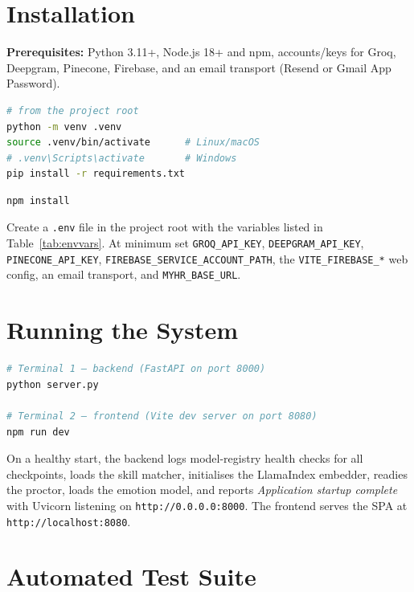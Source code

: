 \documentclass[12pt,a4paper,oneside]{report}
\begin{document}
\section{Installation}

\textbf{Prerequisites:} Python 3.11+, Node.js 18+ and npm, accounts/keys for Groq, Deepgram,
Pinecone, Firebase, and an email transport (Resend or Gmail App Password).

\begin{lstlisting}[language=bash, caption={Backend installation}]
# from the project root
python -m venv .venv
source .venv/bin/activate      # Linux/macOS
# .venv\Scripts\activate       # Windows
pip install -r requirements.txt
\end{lstlisting}

\begin{lstlisting}[language=bash, caption={Frontend installation}]
npm install
\end{lstlisting}

Create a \texttt{.env} file in the project root with the variables listed in
Table~\ref{tab:envvars}. At minimum set \texttt{GROQ\_API\_KEY}, \texttt{DEEPGRAM\_API\_KEY},
\texttt{PINECONE\_API\_KEY}, \texttt{FIREBASE\_SERVICE\_ACCOUNT\_PATH}, the
\texttt{VITE\_FIREBASE\_*} web config, an email transport, and \texttt{MYHR\_BASE\_URL}.

\section{Running the System}

\begin{lstlisting}[language=bash, caption={Starting backend and frontend}]
# Terminal 1 — backend (FastAPI on port 8000)
python server.py

# Terminal 2 — frontend (Vite dev server on port 8080)
npm run dev
\end{lstlisting}

On a healthy start, the backend logs model-registry health checks for all checkpoints, loads
the skill matcher, initialises the LlamaIndex embedder, readies the proctor, loads the emotion
model, and reports \textit{Application startup complete} with Uvicorn listening on
\texttt{http://0.0.0.0:8000}. The frontend serves the SPA at \texttt{http://localhost:8080}.

\section{Automated Test Suite}
\end{document}
